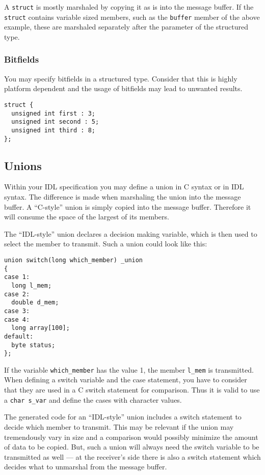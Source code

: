 
A \verb|struct| is mostly marshaled by copying it as is into the 
message buffer. If the \verb|struct| contains variable sized members,
such as the \verb|buffer| member of the above example, these are
marshaled separately after the parameter of the structured type.

\subsubsection{Bitfields}
You may specify bitfields in a structured type. Consider that this 
is highly platform dependent and the usage of bitfields may lead
to unwanted results.

\begin{verbatim}
struct {
  unsigned int first : 3;
  unsigned int second : 5;
  unsigned int third : 8;
};
\end{verbatim}

\subsection{Unions}
Within your IDL specification you
may define a union in C syntax or in IDL syntax. The difference is made
when marshaling the union into the message buffer. A ``C-style'' union
is simply copied into the message buffer. Therefore it will consume the
space of the largest of its members.

The ``IDL-style'' union declares a decision making variable, which is then
used to select the member to transmit. Such a union could look like this:
\begin{verbatim}
union switch(long which_member) _union
{
case 1:
  long l_mem;
case 2:
  double d_mem;
case 3:
case 4:
  long array[100];
default:
  byte status;
};
\end{verbatim}
If the variable \verb|which_member| has the value 1, the member \verb|l_mem|
is transmitted. When defining a switch variable and the case statement, you
have to consider that they are used in a C switch statement for comparison.
Thus it is valid to use a \verb|char s_var| and define the cases with character
values.

The generated code for an ``IDL-style'' union includes a switch statement to 
decide which member to transmit. This may be relevant if the union may
tremendously vary in size and a comparison would possibly minimize the
amount of data to be copied. But, such a union will always need the switch
variable to be transmitted as well --- at the receiver's side there is 
also a switch statement which decides what to unmarshal from the message 
buffer.


